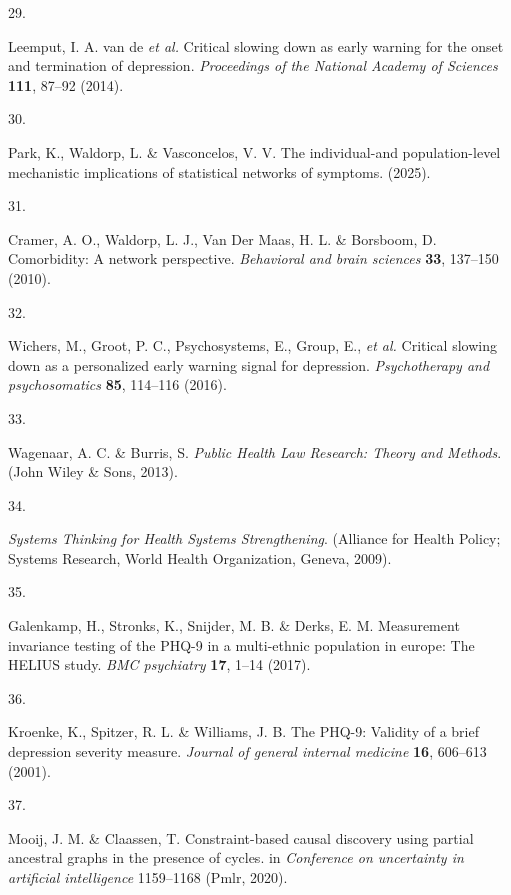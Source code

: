 \documentclass[
]{article}
\newlength{\cslhangindent}
\newlength{\csllabelwidth}
\newenvironment{CSLReferences}[2] %
 {\begin{list}{}{%
  \setlength{\itemindent}{0pt}
  \setlength{\leftmargin}{0pt}
  \setlength{\parsep}{0pt}
  \ifodd #1
   \setlength{\leftmargin}{\cslhangindent}
   \setlength{\itemindent}{-1\cslhangindent}
  \fi
  \setlength{\itemsep}{#2\baselineskip}}}
 {\end{list}}
\newcommand{\CSLLeftMargin}[1]{\parbox[t]{\csllabelwidth}{\strut#1\strut}}
\newcommand{\CSLRightInline}[1]{\parbox[t]{\linewidth - \csllabelwidth}{\strut#1\strut}}
\begin{document}
\begin{CSLReferences}{0}{0}
\CSLLeftMargin{29. }%
\CSLRightInline{Leemput, I. A. van de \emph{et al.} Critical slowing
down as early warning for the onset and termination of depression.
\emph{Proceedings of the National Academy of Sciences} \textbf{111},
87--92 (2014).}

\CSLLeftMargin{30. }%
\CSLRightInline{Park, K., Waldorp, L. \& Vasconcelos, V. V. The
individual-and population-level mechanistic implications of statistical
networks of symptoms. (2025).}

\CSLLeftMargin{31. }%
\CSLRightInline{Cramer, A. O., Waldorp, L. J., Van Der Maas, H. L. \&
Borsboom, D. Comorbidity: A network perspective. \emph{Behavioral and
brain sciences} \textbf{33}, 137--150 (2010).}

\CSLLeftMargin{32. }%
\CSLRightInline{Wichers, M., Groot, P. C., Psychosystems, E., Group, E.,
\emph{et al.} Critical slowing down as a personalized early warning
signal for depression. \emph{Psychotherapy and psychosomatics}
\textbf{85}, 114--116 (2016).}

\CSLLeftMargin{33. }%
\CSLRightInline{Wagenaar, A. C. \& Burris, S. \emph{Public Health Law
Research: Theory and Methods}. (John Wiley \& Sons, 2013).}

\CSLLeftMargin{34. }%
\CSLRightInline{\emph{Systems Thinking for Health Systems
Strengthening}. (Alliance for Health Policy; Systems Research, World
Health Organization, Geneva, 2009).}

\CSLLeftMargin{35. }%
\CSLRightInline{Galenkamp, H., Stronks, K., Snijder, M. B. \& Derks, E.
M. Measurement invariance testing of the PHQ-9 in a multi-ethnic
population in europe: The HELIUS study. \emph{BMC psychiatry}
\textbf{17}, 1--14 (2017).}

\CSLLeftMargin{36. }%
\CSLRightInline{Kroenke, K., Spitzer, R. L. \& Williams, J. B. The
PHQ-9: Validity of a brief depression severity measure. \emph{Journal of
general internal medicine} \textbf{16}, 606--613 (2001).}

\CSLLeftMargin{37. }%
\CSLRightInline{Mooij, J. M. \& Claassen, T. Constraint-based causal
discovery using partial ancestral graphs in the presence of cycles. in
\emph{Conference on uncertainty in artificial intelligence} 1159--1168
(Pmlr, 2020).}


\end{CSLReferences}
\end{document}

